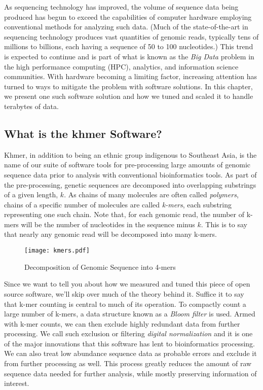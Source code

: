 
As sequencing technology has improved, the volume of sequence data being
produced has begun to exceed the capabilities of computer hardware employing
conventional methods for analyzing such data. (Much of the state-of-the-art in
sequencing technology produces vast quantities of genomic reads, typically tens
of millions to billions, each having a sequence of 50 to 100 nucleotides.) This
trend is expected to continue and is part of what is known as the \textit{Big
Data} \citep{web:bigdata} problem in the high performance computing (HPC),
analytics, and information science communities.  With hardware becoming a
limiting factor, increasing attention has turned to ways to mitigate the
problem with software solutions.  In this chapter, we present one such software
solution and how we tuned and scaled it to handle terabytes of data.

\subsection{What is the khmer Software?}

Khmer, in addition to being an ethnic group indigenous to Southeast Asia, is
the name of our suite of software tools \citep{web:khmer} for pre-processing
large amounts of genomic sequence data prior to analysis with conventional
bioinformatics tools. As part of the pre-processing, genetic sequences are
decomposed into overlapping substrings of a given length, $k$. As chains of
many molecules are often called \textit{polymers}, chains of a specific number
of molecules are called \textit{k-mers}, each substring representing one such
chain. Note that, for each genomic read, the number of k-mers will be the
number of nucleotides in the sequence minus $k$. This is to say that nearly any
genomic read will be decomposed into many k-mers.

\begin{figure}[ht!]
\centering
\texttt{[image: kmers.pdf]}
\caption{Decomposition of Genomic Sequence into 4-mers}
\label{kmers}
\end{figure}


Since we want to tell you about how we measured and tuned this piece of open
source software, we'll skip over much of the theory behind it. Suffice it to
say that k-mer counting is central to much of its operation. To compactly count
a large number of k-mers, a data structure known as a \textit{Bloom filter}
\citep{web:BloomFilter} is used. Armed with k-mer counts, we can then exclude
highly redundant data from further processing. We call such exclusion or
filtering \textit{digital normalization} and it is one of the major innovations
that this software has lent to bioinformatics processing. We can also treat low
abundance sequence data as probable errors and exclude it from further
processing as well. This process greatly reduces the amount of raw sequence
data needed for further analysis, while mostly preserving information of
interest.

